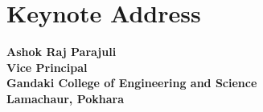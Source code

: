 \chapter[Keynote Address From The Vice Principal]{Keynote Address}



\textbf{Ashok Raj Parajuli}
\\
\textbf{Vice Principal}
\\
\textbf{Gandaki College of Engineering and Science}
\\
\textbf{Lamachaur, Pokhara}

